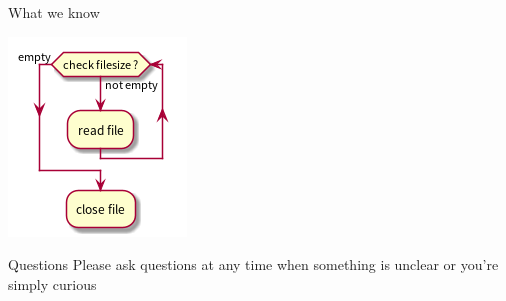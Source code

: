 \documentclass[presentation]{beamer}
\begin{document}
\begin{frame}[label={sec:org25647c6}]{What we know}
\begin{center}
\includegraphics[width=.9\linewidth]{imgs/test.png}
\end{center}
\end{frame}
\begin{frame}[label={sec:org986dce5}]{Questions}
Please \alert{ask questions} at any time when something is unclear or you're simply curious
\end{frame}
\end{document}
